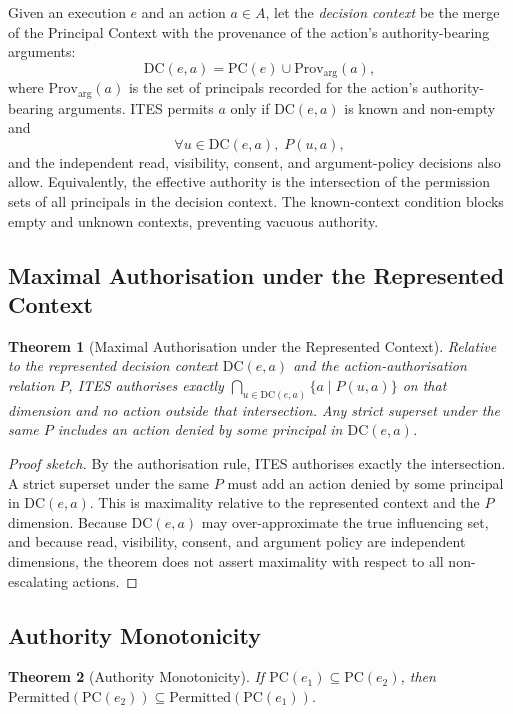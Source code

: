 \documentclass[11pt]{article}
\newtheorem{theorem}{Theorem}
\begin{document}
Given an execution $e$ and an action $a \in A$, let the \emph{decision
context} be the merge of the Principal Context with the provenance of the
action's authority-bearing arguments:
\[
\mathrm{DC}(e,a) = \mathrm{PC}(e) \cup \mathrm{Prov}_{\mathrm{arg}}(a),
\]
where $\mathrm{Prov}_{\mathrm{arg}}(a)$ is the set of principals recorded
for the action's authority-bearing arguments. ITES permits $a$ only if
$\mathrm{DC}(e,a)$ is known and non-empty and
\[
\forall u \in \mathrm{DC}(e,a),\; P(u, a),
\]
and the independent read, visibility, consent, and argument-policy
decisions also allow. Equivalently, the effective authority is the
intersection of the permission sets of all principals in the decision
context. The known-context condition blocks empty and unknown contexts,
preventing vacuous authority.

\subsection{Maximal Authorisation under the Represented Context}

\begin{theorem}[Maximal Authorisation under the Represented Context]
Relative to the represented decision context $\mathrm{DC}(e,a)$ and the
action-authorisation relation $P$, ITES authorises exactly
$\bigcap_{u \in \mathrm{DC}(e,a)} \{a \mid P(u, a)\}$ on that dimension and
no action outside that intersection. Any strict superset under the same $P$
includes an action denied by some principal in $\mathrm{DC}(e,a)$.
\end{theorem}

\begin{proof}[Proof sketch]
By the authorisation rule, ITES authorises exactly the intersection. A
strict superset under the same $P$ must add an action denied by some
principal in $\mathrm{DC}(e,a)$. This is maximality relative to the
represented context and the $P$ dimension. Because $\mathrm{DC}(e,a)$ may
over-approximate the true influencing set, and because read, visibility,
consent, and argument policy are independent dimensions, the theorem does
not assert maximality with respect to all non-escalating actions.
\end{proof}

\subsection{Authority Monotonicity}

\begin{theorem}[Authority Monotonicity]
If $\mathrm{PC}(e_1) \subseteq \mathrm{PC}(e_2)$, then
$\mathrm{Permitted}(\mathrm{PC}(e_2)) \subseteq
\mathrm{Permitted}(\mathrm{PC}(e_1))$.
\end{theorem}
\end{document}
